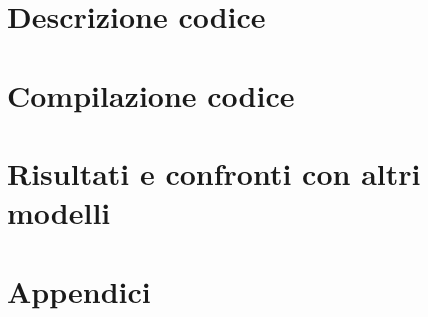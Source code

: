 \documentclass[10pt,a4paper,usenatbib]{article}
\begin{document}
\section{Descrizione codice}


\section{Compilazione codice}


\section{Risultati e confronti con altri modelli}

\pagebreak
\appendix
\section{Appendici}
\end{document}
